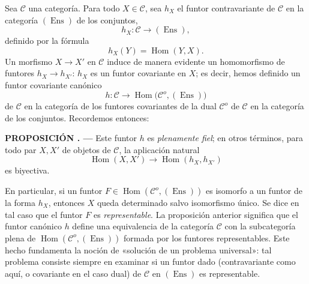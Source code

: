 \documentclass[11pt,twoside,openany]{book}
\numberwithin{equation}{section}
\theoremstyle{plain}
\theoremstyle{definition}
\theoremstyle{remark}
\newcommand{\result}[2]{%
  \par\medskip\noindent\textbf{#1%
  \if\relax\detokenize{#2}\relax\else\space#2\fi. ---}\enspace
}
\theoremstyle{plain}
\theoremstyle{definition}
\theoremstyle{remark}
\begin{document}
Sea $\mathcal C$ una categoría. Para todo $X\in\mathcal C$, sea $h_X$ el
funtor contravariante de $\mathcal C$ en la categoría $(\operatorname{Ens})$
de los conjuntos,
\[
  h_X:\mathcal C\longrightarrow(\operatorname{Ens}),
\]
definido por la fórmula
\[
  h_X(Y)=\operatorname{Hom}(Y,X).
\]
Un morfismo $X\longrightarrow X'$ en $\mathcal C$ induce de manera evidente un
homomorfismo de funtores $h_X\longrightarrow h_{X'}$: $h_X$ es un funtor
covariante en $X$; es decir, hemos definido un funtor covariante canónico
\[
  h:\mathcal C\longrightarrow
  \operatorname{Hom}\bigl(\mathcal C^o,(\operatorname{Ens})\bigr)
\]
de $\mathcal C$ en la categoría de los funtores covariantes de la dual
$\mathcal C^o$ de $\mathcal C$ en la categoría de los conjuntos. Recordemos
entonces:

\result{PROPOSICIÓN}{1.1} Este funtor $h$ es \emph{plenamente fiel}; en otros
términos, para todo par $X,X'$ de objetos de $\mathcal C$, la aplicación
natural
\[
  \operatorname{Hom}(X,X')\longrightarrow
  \operatorname{Hom}(h_X,h_{X'})
\]
es biyectiva.

En particular, si un funtor
$F\in\operatorname{Hom}(\mathcal C^o,(\operatorname{Ens}))$ es isomorfo a un
funtor de la forma $h_X$, entonces $X$ queda determinado salvo isomorfismo
único. Se dice en tal caso que el funtor $F$ es \emph{representable}. La
proposición anterior significa que el funtor canónico $h$ define una
equivalencia de la categoría $\mathcal C$ con la subcategoría plena de
$\operatorname{Hom}(\mathcal C^o,(\operatorname{Ens}))$ formada por los
funtores representables. Este hecho fundamenta la noción de «solución de un
problema universal»: tal problema consiste siempre en examinar si un funtor
dado (contravariante como aquí, o covariante en el caso dual) de $\mathcal C$
en $(\operatorname{Ens})$ es representable.
\end{document}
